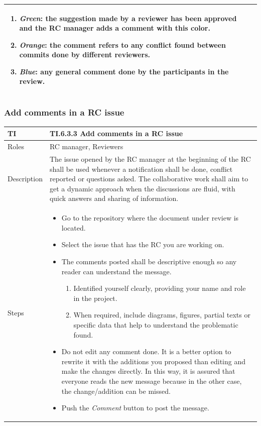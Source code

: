 \documentclass{template/openetcs_article}
\begin{document}
\begin{flushleft}
\begin{supertabular}{|m{2cm}|m{13cm}|}
\begin{itemize}
\begin{enumerate}
\item {\it Green}: the suggestion made by a reviewer has been approved and the RC manager adds a comment with this color.
\item {\it Orange}: the comment refers to any conflict found between commits done by different reviewers.
\item {\it Blue}: any general comment done by the participants in the review. 
\end{enumerate} 
\end{itemize}

\\\hline
\end{supertabular}
\end{flushleft}

\subsubsection{Add comments in a RC issue}

\begin{flushleft}
\tablefirsthead{}
\tablehead{}
\tabletail{}
\tablelasttail{}
\begin{supertabular}{|m{2cm}|m{13cm}|}
\hline
{}
TI & 
TI.6.3.3 Add comments in a RC issue
\\\hline
Roles &
RC manager, Reviewers
\\\hline
Description &
The issue opened by the RC manager at the beginning of the RC shall be used whenever a notification shall be done, conflict reported or questions asked. The collaborative work shall aim to get a dynamic approach when the discussions are fluid, with quick answers and sharing of information.
\\\hline
Steps &
\begin{itemize}
\item Go to the repository where the document under review is located.
\item Select the issue that has the RC you are working on.
\item The comments posted shall be descriptive enough so any reader can understand the message. 
\begin{enumerate}
\item Identified yourself clearly, providing your name and role in the project.
\item When required, include diagrams, figures, partial texts or specific data that help to understand the problematic found.
\end{enumerate}
\item Do not edit any comment done. It is a better option to rewrite it with the additions you proposed than editing and make the changes directly. In this way, it is assured that everyone reads the new message because in the other case, the change/addition can be missed.
\item Push the {\it Comment} button to post the message.
\end{itemize}

\\\hline
\end{supertabular}
\end{flushleft}
\end{document}

